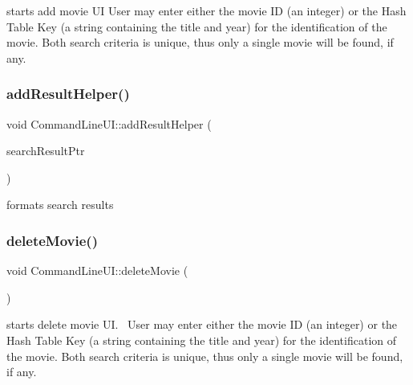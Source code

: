 starts add movie UI User may enter either the movie ID (an integer) or the Hash Table Key (a string containing the title and year) for the identification of the movie. Both search criteria is unique, thus only a single movie will be found, if any. \mbox{\label{class_command_line_u_i_adb828755a84f2e3209791f96eabd1bfa}} 
\subsubsection{\texorpdfstring{add\+Result\+Helper()}{addResultHelper()}}
{\footnotesize\ttfamily void Command\+Line\+U\+I\+::add\+Result\+Helper (\begin{DoxyParamCaption}\item[{\hyperlink{class_search_result}{Search\+Result}$<$ \hyperlink{class_list}{List}$<$ \hyperlink{class_main_storage_node}{Main\+Storage\+Node} $\ast$$>$ $\ast$$>$ $\ast$}]{search\+Result\+Ptr }\end{DoxyParamCaption})\hspace{0.3cm}{\ttfamily [static]}}

formats search results \mbox{\label{class_command_line_u_i_ac132799949aab15476dcbe20f7ac4c5f}} 
\subsubsection{\texorpdfstring{delete\+Movie()}{deleteMovie()}}
{\footnotesize\ttfamily void Command\+Line\+U\+I\+::delete\+Movie (\begin{DoxyParamCaption}{ }\end{DoxyParamCaption})\hspace{0.3cm}{\ttfamily [static]}}

starts delete movie UI.~\newline
User may enter either the movie ID (an integer) or the Hash Table Key (a string containing the title and year) for the identification of the movie. Both search criteria is unique, thus only a single movie will be found, if any. \mbox{\label{class_command_line_u_i_a2c75c2a87bdf09d8c29decab9fd27ab2}} 
